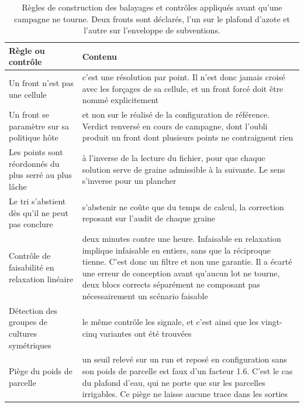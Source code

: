\begin{table}[H]
  \centering
  \caption{Règles de construction des balayages et contrôles appliqués avant qu'une campagne ne
  tourne. Deux fronts sont déclarés, l'un sur le plafond d'azote et l'autre sur l'enveloppe de
  subventions.}
  \label{tab:ann-balayages}
  \scriptsize
  \setlength{\tabcolsep}{4pt}
  \begin{tabularx}{\textwidth}{@{}>{\raggedright\arraybackslash}p{34mm}X@{}}
    \toprule
    \textbf{Règle ou contrôle} & \textbf{Contenu} \\
    \midrule
    Un front n'est pas une cellule & c'est une résolution par point. Il n'est donc jamais
      croisé avec les forçages de sa cellule, et un front forcé doit être nommé explicitement \\
    Un front se paramètre sur sa politique hôte & et non sur le réalisé de la configuration de
      référence. Verdict renversé en cours de campagne, dont l'oubli produit un front dont
      plusieurs points ne contraignent rien \\
    Les points sont réordonnés du plus serré au plus lâche & à l'inverse de la lecture du
      fichier, pour que chaque solution serve de graine admissible à la suivante. Le sens
      s'inverse pour un plancher \\
    Le tri s'abstient dès qu'il ne peut pas conclure & s'abstenir ne coûte que du temps de
      calcul, la correction reposant sur l'audit de chaque graine \\
    Contrôle de faisabilité en relaxation linéaire & deux minutes contre une heure. Infaisable
      en relaxation implique infaisable en entiers, sans que la réciproque tienne. C'est donc
      un filtre et non une garantie. Il a écarté une erreur de conception avant qu'aucun lot ne
      tourne, deux blocs corrects séparément ne composant pas nécessairement un scénario
      faisable \\
    Détection des groupes de cultures symétriques & le même contrôle les signale, et c'est
      ainsi que les vingt-cinq variantes ont été trouvées \\
    Piège du poids de parcelle & un seuil relevé sur un run et reposé en configuration sans son
      poids de parcelle est faux d'un facteur \num{1.6}. C'est le cas du plafond d'eau, qui ne
      porte que sur les parcelles irrigables. Ce piège ne laisse aucune trace dans les
      sorties \\
    \bottomrule
  \end{tabularx}
\end{table}
